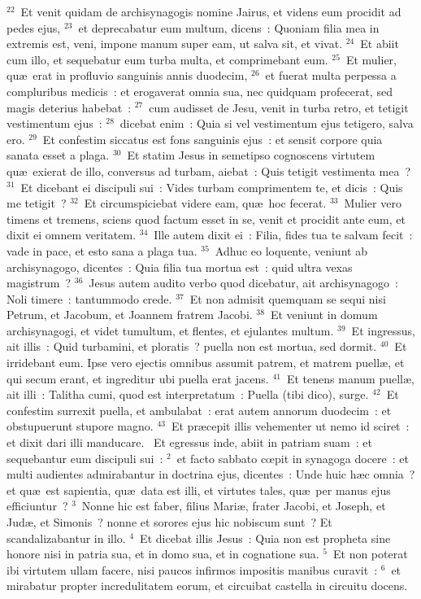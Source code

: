 ${}^{22}$~Et venit quidam de archisynagogis nomine Jairus, et videns eum procidit ad pedes ejus,
${}^{23}$~et deprecabatur eum multum, dicens~: Quoniam filia mea in extremis est, veni, impone manum super eam, ut salva sit, et vivat.
${}^{24}$~Et abiit cum illo, et sequebatur eum turba multa, et comprimebant eum.
${}^{25}$~Et mulier, qu\ae\ erat in profluvio sanguinis annis duodecim,
${}^{26}$~et fuerat multa perpessa a compluribus medicis~: et erogaverat omnia sua, nec quidquam profecerat, sed magis deterius habebat~:
${}^{27}$~cum audisset de Jesu, venit in turba retro, et tetigit vestimentum ejus~:
${}^{28}$~dicebat enim~: Quia si vel vestimentum ejus tetigero, salva ero.
${}^{29}$~Et confestim siccatus est fons sanguinis ejus~: et sensit corpore quia sanata esset a plaga.
${}^{30}$~Et statim Jesus in semetipso cognoscens virtutem qu\ae\ exierat de illo, conversus ad turbam, aiebat~: Quis tetigit vestimenta mea~?
${}^{31}$~Et dicebant ei discipuli sui~: Vides turbam comprimentem te, et dicis~: Quis me tetigit~?
${}^{32}$~Et circumspiciebat videre eam, qu\ae\ hoc fecerat.
${}^{33}$~Mulier vero timens et tremens, sciens quod factum esset in se, venit et procidit ante eum, et dixit ei omnem veritatem.
${}^{34}$~Ille autem dixit ei~: Filia, fides tua te salvam fecit~: vade in pace, et esto sana a plaga tua.
${}^{35}$~Adhuc eo loquente, veniunt ab archisynagogo, dicentes~: Quia filia tua mortua est~: quid ultra vexas magistrum~?
${}^{36}$~Jesus autem audito verbo quod dicebatur, ait archisynagogo~: Noli timere~: tantummodo crede.
${}^{37}$~Et non admisit quemquam se sequi nisi Petrum, et Jacobum, et Joannem fratrem Jacobi.
${}^{38}$~Et veniunt in domum archisynagogi, et videt tumultum, et flentes, et ejulantes multum.
${}^{39}$~Et ingressus, ait illis~: Quid turbamini, et ploratis~? puella non est mortua, sed dormit.
${}^{40}$~Et irridebant eum. Ipse vero ejectis omnibus assumit patrem, et matrem puell\ae , et qui secum erant, et ingreditur ubi puella erat jacens.
${}^{41}$~Et tenens manum puell\ae , ait illi~: Talitha cumi, quod est interpretatum~: Puella (tibi dico), surge.
${}^{42}$~Et confestim surrexit puella, et ambulabat~: erat autem annorum duodecim~: et obstupuerunt stupore magno.
${}^{43}$~Et pr\ae cepit illis vehementer ut nemo id sciret~: et dixit dari illi manducare.
~\lettrine[lines=10,image=true,loversize=0.05,lraise=-0.03]{E}{}t egressus inde, abiit in patriam suam~: et sequebantur eum discipuli sui~:
${}^{2}$~et facto sabbato cœpit in synagoga docere~: et multi audientes admirabantur in doctrina ejus, dicentes~: Unde huic h\ae c omnia~? et qu\ae\ est sapientia, qu\ae\ data est illi, et virtutes tales, qu\ae\ per manus ejus efficiuntur~?
${}^{3}$~Nonne hic est faber, filius Mari\ae , frater Jacobi, et Joseph, et Jud\ae , et Simonis~? nonne et sorores ejus hic nobiscum sunt~? Et scandalizabantur in illo.
${}^{4}$~Et dicebat illis Jesus~: Quia non est propheta sine honore nisi in patria sua, et in domo sua, et in cognatione sua.
${}^{5}$~Et non poterat ibi virtutem ullam facere, nisi paucos infirmos impositis manibus curavit~:
${}^{6}$~et mirabatur propter incredulitatem eorum, et circuibat castella in circuitu docens.


